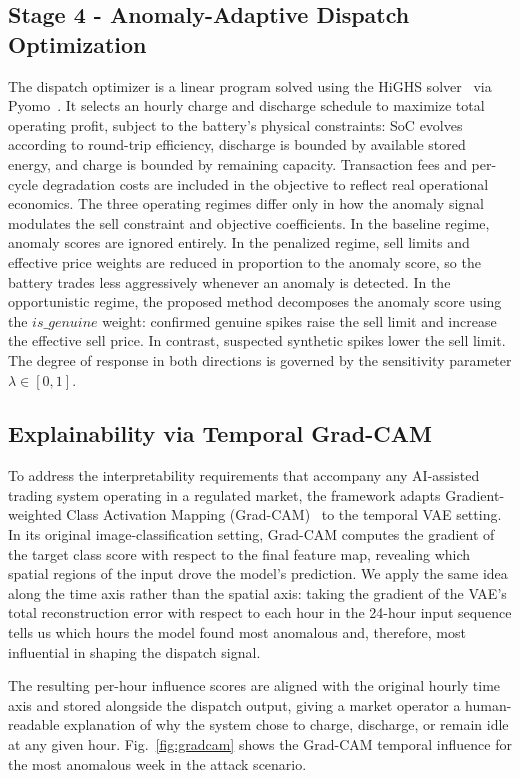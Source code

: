 \documentclass[journal]{IEEEtran}
\begin{document}
\subsection{Stage 4 - Anomaly-Adaptive Dispatch Optimization}
The dispatch optimizer is a linear program solved using the HiGHS solver~\cite{HiGHS} via Pyomo~\cite{Pyomo}. It selects an hourly charge and discharge schedule to maximize total operating profit, subject to the battery's physical constraints: SoC evolves according to round-trip efficiency, discharge is bounded by available stored energy, and charge is bounded by remaining capacity. Transaction fees and per-cycle degradation costs are included in the objective to reflect real operational economics. The three operating regimes differ only in how the anomaly signal modulates the sell constraint and objective coefficients. In the baseline regime, anomaly scores are ignored entirely. In the penalized regime, sell limits and effective price weights are reduced in proportion to the anomaly score, so the battery trades less aggressively whenever an anomaly is detected. In the opportunistic regime, the proposed method decomposes the anomaly score using the $is\_genuine$ weight: confirmed genuine spikes raise the sell limit and increase the effective sell price. In contrast, suspected synthetic spikes lower the sell limit. The degree of response in both directions is governed by the sensitivity parameter $\lambda \in [0, 1]$.

\subsection{Explainability via Temporal Grad-CAM}

To address the interpretability requirements that accompany any AI-assisted trading system operating in a regulated market, the framework adapts Gradient-weighted Class Activation Mapping (Grad-CAM)~\cite{GradCAM} to the temporal VAE setting. In its original image-classification setting, Grad-CAM computes the gradient of the target class score with respect to the final feature map, revealing which spatial regions of the input drove the model's prediction. We apply the same idea along the time axis rather than the spatial axis: taking the gradient of the VAE's total reconstruction error with respect to each hour in the 24-hour input sequence tells us which hours the model found most anomalous and, therefore, most influential in shaping the dispatch signal.

The resulting per-hour influence scores are aligned with the original hourly time axis and stored alongside the dispatch output, giving a market operator a human-readable explanation of why the system chose to charge, discharge, or remain idle at any given hour. Fig.~\ref{fig:gradcam} shows the Grad-CAM temporal influence for the most anomalous week in the attack scenario.
\end{document}
